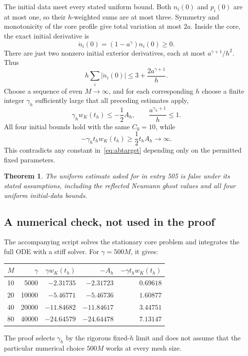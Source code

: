 \documentclass[11pt,a4paper]{article}
\newtheorem{theorem}{Theorem}[section]
\theoremstyle{remark}
\begin{document}
The initial data meet every stated uniform bound. Both $n_i(0)$ and $p_i(0)$ are at most one, so their $h$-weighted sums are at most three. Symmetry and monotonicity of the core profile give total variation at most $2a$. Inside the core, the exact initial derivative is
\[
 \dot n_i(0)=(1-a^\gamma)n_i(0)\ge0.
\]
There are just two nonzero initial exterior derivatives, each at most $a^{\gamma+1}/h^2$. Thus
\begin{equation}\label{eq:initderiv}
 h\sum_i|\dot n_i(0)|\le3+\frac{2a^{\gamma+1}}h.
\end{equation}
Choose a sequence of even $M\to\infty$, and for each corresponding $h$ choose a finite integer $\gamma_h$ sufficiently large that all preceding estimates apply,
\[
 \gamma_h w_K(t_h)\le-\frac12A_h,
 \qquad \frac{a^{\gamma_h+1}}h\le1.
\]
All four initial bounds hold with the same $C_0=10$, while
\[
 -\gamma_h t_hw_K(t_h)\ge\frac12t_hA_h\longrightarrow\infty.
\]
This contradicts any constant in~\eqref{eq:abtarget} depending only on the permitted fixed parameters.

\begin{theorem}
The uniform estimate asked for in entry 505 is false under its stated assumptions, including the reflected Neumann ghost values and all four uniform initial-data bounds.
\end{theorem}

\subsection{A numerical check, not used in the proof}

The accompanying script solves the stationary core problem and integrates the full ODE with a stiff solver. For $\gamma=500M$, it gives:
\begin{center}
\begin{tabular}{@{}rrrrr@{}}
\toprule
$M$ & $\gamma$ & $\gamma w_K(t_h)$ & $-A_h$ & $-\gamma t_hw_K(t_h)$\\
\midrule
10 & 5000 & $-2.31735$ & $-2.31723$ & $0.69618$\\
20 & 10000 & $-5.46771$ & $-5.46736$ & $1.60877$\\
40 & 20000 & $-11.84682$ & $-11.84617$ & $3.44751$\\
80 & 40000 & $-24.64579$ & $-24.64478$ & $7.13147$\\
\bottomrule
\end{tabular}
\end{center}
The proof selects $\gamma_h$ by the rigorous fixed-$h$ limit and does not assume that the particular numerical choice $500M$ works at every mesh size.
\end{document}
